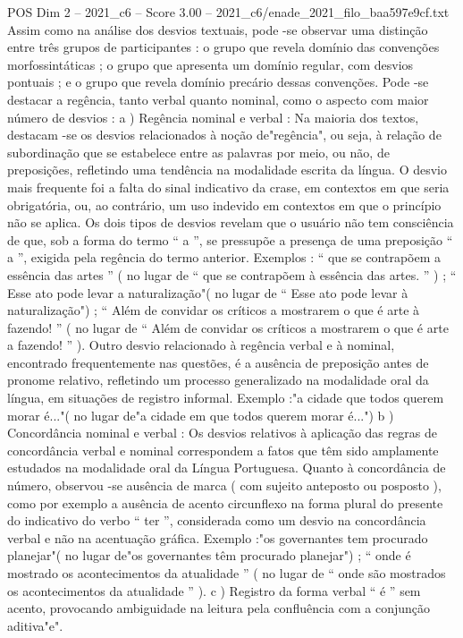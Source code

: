 \begin{textsample}{POS Dim 2 – 2021\_c6 – Score 3.00 – 2021\_c6/enade\_2021\_filo\_baa597e9cf.txt}
Assim como na análise dos desvios textuais, pode -se observar uma distinção entre três grupos de participantes : o grupo que revela domínio das convenções morfossintáticas ; o grupo que apresenta um domínio regular, com desvios pontuais ; e o grupo que revela domínio precário dessas convenções.
Pode -se destacar a regência, tanto verbal quanto nominal, como o aspecto com maior número de desvios : a ) Regência nominal e verbal : Na maioria dos textos, destacam -se os desvios relacionados à noção de"regência", ou seja, à relação de subordinação que se estabelece entre as palavras por meio, ou não, de preposições, refletindo uma tendência na modalidade escrita da língua.
O desvio mais frequente foi a falta do sinal indicativo da crase, em contextos em que seria obrigatória, ou, ao contrário, um uso indevido em contextos em que o princípio não se aplica.
Os dois tipos de desvios revelam que o usuário não tem consciência de que, sob a forma do termo “ a ”, se pressupõe a presença de uma preposição “ a ”, exigida pela regência do termo anterior.
Exemplos : “ que se contrapõem a essência das artes ” ( no lugar de “ que se contrapõem à essência das artes. ” ) ; “ Esse ato pode levar a naturalização"( no lugar de “ Esse ato pode levar à naturalização") ; “ Além de convidar os críticos a mostrarem o que é arte à fazendo! ” ( no lugar de “ Além de convidar os críticos a mostrarem o que é arte a fazendo! ” ).
Outro desvio relacionado à regência verbal e à nominal, encontrado frequentemente nas questões, é a ausência de preposição antes de pronome relativo, refletindo um processo generalizado na modalidade oral da língua, em situações de registro informal.
Exemplo :"a cidade que todos querem morar é..."( no lugar de"a cidade em que todos querem morar é...") b ) Concordância nominal e verbal : Os desvios relativos à aplicação das regras de concordância verbal e nominal correspondem a fatos que têm sido amplamente estudados na modalidade oral da Língua Portuguesa.
Quanto à concordância de número, observou -se ausência de marca ( com sujeito anteposto ou posposto ), como por exemplo a ausência de acento circunflexo na forma plural do presente do indicativo do verbo “ ter ”, considerada como um desvio na concordância verbal e não na acentuação gráfica.
Exemplo :"os governantes tem procurado planejar"( no lugar de"os governantes têm procurado planejar") ; “ onde é mostrado os acontecimentos da atualidade ” ( no lugar de “ onde são mostrados os acontecimentos da atualidade ” ). c ) Registro da forma verbal “ é ” sem acento, provocando ambiguidade na leitura pela confluência com a conjunção aditiva"e".

\end{textsample}
